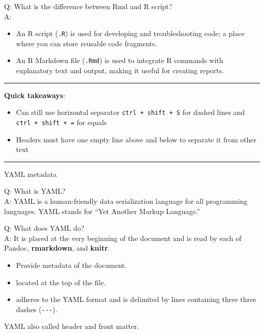 \documentclass[
  a4paper,
  twoside,
  openright]{book}
\providecommand{\tightlist}{%
  \setlength{\itemsep}{0pt}\setlength{\parskip}{0pt}}
\theoremstyle{definition}
\theoremstyle{definition}
\theoremstyle{definition}
\theoremstyle{definition}
\theoremstyle{remark}
\begin{document}
Q: What is the difference between Rmd and R script?\\
A:

\begin{itemize}
\tightlist
\item
  An R script (\texttt{.R}) is used for developing and troubleshooting code; a place where you can store reusable code fragments.
\item
  An R Markdown file (\texttt{.Rmd}) is used to integrate R commands with explanatory text and output, making it useful for creating reports.
\end{itemize}

\begin{center}\rule{0.5\linewidth}{0.5pt}\end{center}

\textbf{Quick takeaways}:

\begin{itemize}
\tightlist
\item
  Can still use horizontal separator \texttt{ctrl\ +\ shift\ +\ S} for dashed lines and \texttt{ctrl\ +\ shift\ +\ =} for equals
\item
  Headers must have one empty line above and below to separate it from other text
\end{itemize}

\begin{center}\rule{0.5\linewidth}{0.5pt}\end{center}

YAML metadata

Q: What is YAML?\\
A: YAML is a human-friendly data serialization language for all programming languages. YAML stands for ``Yet Another Markup Language.''

Q: What does YAML do?\\
A: It is placed at the very beginning of the document and is read by each of Pandoc, \textbf{rmarkdown}, and \textbf{knitr}.

\begin{itemize}
\tightlist
\item
  Provide metadata of the document.
\item
  located at the top of the file.
\item
  adheres to the YAML format and is delimited by lines containing three three dashes (\texttt{-\/-\/-}).
\end{itemize}

YAML also called header and front matter.
\end{document}
